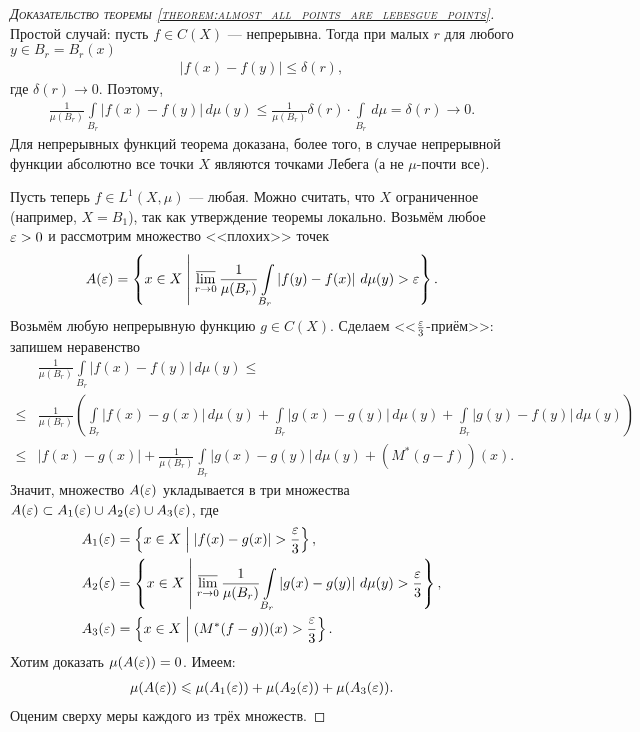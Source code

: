 \begin{proof}[\normalfont\textsc{Доказательство теоремы \ref{theorem:almost_all_points_are_lebesgue_points}}] 
 Простой случай: пусть $f \in C(X)$  --- непрерывна. Тогда при малых $r$ для любого $y \in B_r = B_r(x)$ \begin{align*}
  \left| f(x) - f(y) \right| \leqslant \delta(r)
 ,\end{align*} где $\delta(r) \to 0$. Поэтому, \begin{align*}
  \frac{1}{\mu(B_r)} \int\limits_{B_r} \left| f(x) - f(y) \right| \, d\mu(y) \leqslant \frac{1}{\mu(B_r)} \delta(r) \cdot \int\limits_{B_r} \, d\mu   = \delta(r) \to 0
 .\end{align*} Для непрерывных функций теорема доказана, более того, в случае непрерывной функции абсолютно все точки $X$ являются точками Лебега (а не $\mu$-почти все).

 Пусть теперь  $f \in L^{1}(X, \mu)$ --- любая. Можно считать, что $X$ ограниченное (например, $X = B_1$), так как утверждение теоремы локально. Возьмём любое $\varepsilon > 0$ и рассмотрим множество <<плохих>> точек \begin{align*}
  A(\varepsilon) = \left\{ x \in X \;\middle|\; \varlimsup_{r \to 0} \frac{1}{\mu(B_r)} \int\limits_{B_r}  \left| f(y) - f(x) \right| \, d\mu(y) > \varepsilon   \right\}
 .\end{align*} Возьмём любую непрерывную функцию $g \in C(X)$. Сделаем <<$\frac{\varepsilon}{3}$-приём>>: запишем неравенство \begin{align*}
 &\frac{1}{\mu(B_r)} \int\limits_{B_r} \left| f(x) - f(y) \right| \, d\mu(y) \leqslant \\
 \leqslant &\frac{1}{\mu(B_r)} \left( \int\limits_{B_r} \left| f(x) - g(x) \right| \, d\mu(y)  + \int\limits_{B_r} \left| g(x) - g(y) \right| \, d\mu(y)  + \int\limits_{B_r} \left| g(y) - f(y) \right| \, d\mu(y) \right) \\
 \leqslant &\left| f(x) - g(x) \right| + \frac{1}{\mu(B_r)} \int\limits_{B_r} \left| g(x) - g(y) \right| \, d\mu(y) + (M^{\ast}(g-f))(x)
 .\end{align*} Значит, множество $A(\varepsilon)$ укладывается в три множества $A(\varepsilon) \subset A_1(\varepsilon) \cup A_2(\varepsilon) \cup A_3(\varepsilon)$, где \begin{align*}
 A_1(\varepsilon) &= \left\{ x \in X \;\middle|\; \left| f(x) - g(x) \right| > \frac{\varepsilon}{3} \right\}, \\
 A_2(\varepsilon) &= \left\{ x \in X \;\middle|\; \varlimsup_{r \to 0} \frac{1}{\mu(B_r)} \int\limits_{B_r} \left| g(x) - g(y) \right| \, d\mu(y) > \frac{\varepsilon}{3}   \right\}, \\
 A_3(\varepsilon) &= \left\{ x \in X \;\middle|\; (M^{\ast}(f-g))(x) > \frac{\varepsilon}{3} \right\}
 .\end{align*} Хотим доказать $\mu(A(\varepsilon)) = 0$. Имеем:  \begin{align*}
  \mu(A(\varepsilon)) \leqslant \mu(A_1(\varepsilon)) + \mu(A_2(\varepsilon)) + \mu(A_3(\varepsilon))
 .\end{align*} Оценим сверху меры каждого из трёх множеств.


\end{proof}
